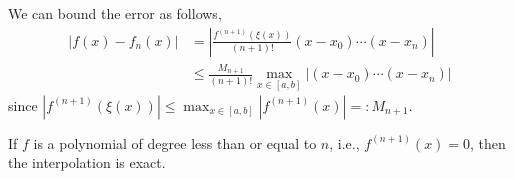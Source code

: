 \begin{cor}
     We can bound the error as follows,
     \begin{align*}
        \left|f(x)-f_n(x)\right| &=\left|\frac{f^{(n+1)}(\xi(x))}{(n+1) !}\left(x-x_0\right) \cdots\left(x-x_n\right)\right| \\
        & \leq \frac{M_{n+1}}{(n+1) !} \max _{x \in[a, b]}\left|\left(x-x_0\right) \cdots\left(x-x_n\right)\right|
    \end{align*}
    since $\left|f^{(n+1)}(\xi(x))\right| \leq \max _{x \in[a, b]}\left|f^{(n+1)}(x)\right|=: M_{n+1}$.
\end{cor}
    
\begin{rmk}
    If $f$ is a polynomial of degree less than or equal to $n$, i.e., $f^{(n+1)}(x)=0$, then the interpolation is exact.
\end{rmk}

